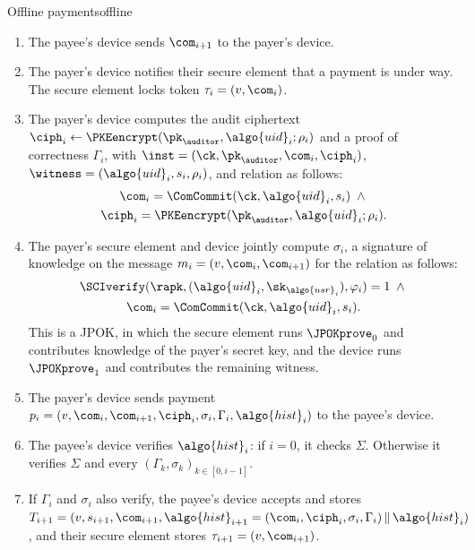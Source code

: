 \begin{protocolbox}{Offline payments}{offline}
\begin{description}
\begin{enumerate}
        \item The payee's device sends $\com_{i+1}$ to the payer's device.

        \item The payer's device notifies their secure element that a payment
          is under way. The secure element locks token $\tau_i = (v, \com_i)$.

        \item The payer's device computes the audit ciphertext $\ciph_i
          \leftarrow \PKEencrypt(\pk_\auditor, \algo{uid}_i; \rho_i)$ and a
          proof of correctness $\Gamma_i$, with $\inst = (\ck, \pk_\auditor,
          \com_i, \ciph_i)$, $\witness = (\algo{uid}_i, s_i, \rho_i)$, and
          relation as follows:
          \begin{gather*}
            \com_i = \ComCommit(\ck, \algo{uid}_i, s_i) \;\wedge{} \\ \ciph_i =
            \PKEencrypt(\pk_\auditor, \algo{uid}_i; \rho_i).
          \end{gather*}

        \item The payer's secure element and device jointly compute $\sigma_i$,
          a signature of knowledge on the message $m_i = (v, \com_i,
          \com_{i+1})$ for the relation as follows:
          \begin{gather*}
            \SCIverify(\rapk, (\algo{uid}_i, \sk_{\algo{usr}_i}), \varphi_i) =
            1 \;\wedge{} \\ \com_i = \ComCommit(\ck, \algo{uid}_i, s_i).
          \end{gather*}
          This is a JPOK, in which the secure element runs $\JPOKprove_0$ and
          contributes knowledge of the payer's secret key, and the device runs
          $\JPOKprove_1$ and contributes the remaining witness.

        \item The payer's device sends payment $p_i = (v, \com_i, \com_{i+1},
          \ciph_i, \sigma_i, \Gamma_i, \algo{hist}_i)$ to the payee's device.

        \item The payee's device verifies $\algo{hist}_i$: if $i = 0$, it
          checks $\Sigma$. Otherwise it verifies $\Sigma$ and every $(\Gamma_k,
          \sigma_k)_{k \in [0, i-1]}$.

        \item If $\Gamma_i$ and $\sigma_i$ also verify, the payee's device
          accepts and stores $T_{i+1} = (v, s_{i+1}, \com_{i+1},
          \algo{hist}_{i+1} = (\com_i, \ciph_i, \sigma_i, \Gamma_i) \, \| \,
          \algo{hist}_i)$, and their secure element stores $\tau_{i+1} = (v,
          \com_{i+1})$.


\end{enumerate}
\end{description}
\end{protocolbox}
